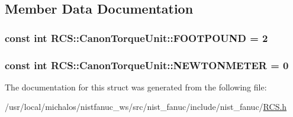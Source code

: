 \subsection{Member Data Documentation}
\hypertarget{structRCS_1_1CanonTorqueUnit_a98248bb91570aead308ba00dfc116ac7}{
\subsubsection[{F\-O\-O\-T\-P\-O\-U\-N\-D}]{\setlength{\rightskip}{0pt plus 5cm}const int R\-C\-S\-::\-Canon\-Torque\-Unit\-::\-F\-O\-O\-T\-P\-O\-U\-N\-D = 2\hspace{0.3cm}{\ttfamily [static]}}}\label{structRCS_1_1CanonTorqueUnit_a98248bb91570aead308ba00dfc116ac7}
\hypertarget{structRCS_1_1CanonTorqueUnit_ad6f5a1535c7a03c2034823a9ce461393}{
\subsubsection[{N\-E\-W\-T\-O\-N\-M\-E\-T\-E\-R}]{\setlength{\rightskip}{0pt plus 5cm}const int R\-C\-S\-::\-Canon\-Torque\-Unit\-::\-N\-E\-W\-T\-O\-N\-M\-E\-T\-E\-R = 0\hspace{0.3cm}{\ttfamily [static]}}}\label{structRCS_1_1CanonTorqueUnit_ad6f5a1535c7a03c2034823a9ce461393}


The documentation for this struct was generated from the following file\-:\begin{DoxyCompactItemize}
\item 
/usr/local/michalos/nistfanuc\-\_\-ws/src/nist\-\_\-fanuc/include/nist\-\_\-fanuc/\hyperlink{RCS_8h}{R\-C\-S.\-h}\end{DoxyCompactItemize}
